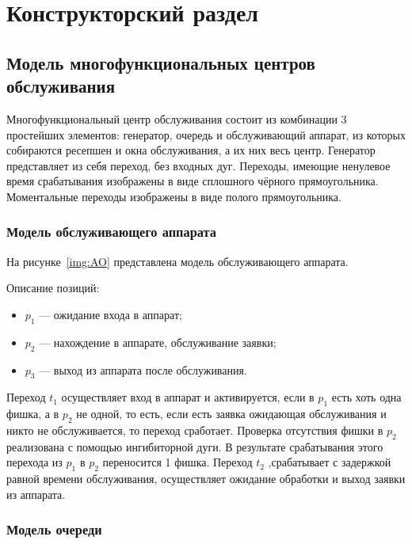\chapter{Конструкторский раздел}

\section[Модель многофункциональных центров обслуживания]{Модель многофункциональных центров\\обслуживания}

Многофункциональный центр обслуживания состоит из комбинации 3 простейших элементов: генератор, очередь и обслуживающий аппарат, из которых собираются ресепшен и окна обслуживания, а их них весь центр. Генератор представляет из себя переход, без входных дуг. Переходы, имеющие ненулевое время срабатывания изображены в виде сплошного чёрного прямоугольника. Моментальные переходы изображены в виде полого прямоугольника.


\subsection{Модель обслуживающего аппарата}

На рисунке~\ref{img:AO} представлена модель обслуживающего аппарата.

\FloatBarrier

Описание позиций:
\begin{itemize}[label=---]
	\item $p_1$ --- ожидание входа в аппарат;
	\item $p_2$ --- нахождение в аппарате, обслуживание заявки;
	\item $p_3$ --- выход из аппарата после обслуживания.
\end{itemize}

Переход $t_1$ осуществляет вход в аппарат и активируется, если в $p_1$ есть хоть одна фишка, а в $p_2$ не одной, то есть, если есть заявка ожидающая обслуживания и никто не обслуживается, то переход сработает. Проверка отсутствия фишки в $p_2$ реализована с помощью ингибиторной дуги. В результате срабатывания этого перехода из $p_1$ в $p_2$ переносится 1 фишка. Переход $t_2$ ,срабатывает с задержкой равной времени обслуживания, осуществляет ожидание обработки и выход заявки из аппарата.

\subsection{Модель очереди}

